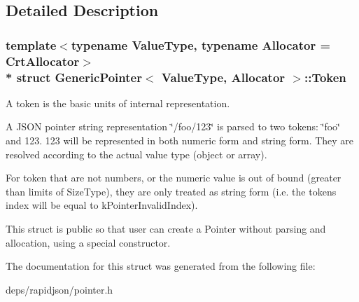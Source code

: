 \subsection{Detailed Description}
\subsubsection*{template$<$typename Value\+Type, typename Allocator = Crt\+Allocator$>$\\*
struct Generic\+Pointer$<$ Value\+Type, Allocator $>$\+::\+Token}

A token is the basic units of internal representation. 

A J\+S\+ON pointer string representation \char`\"{}/foo/123\char`\"{} is parsed to two tokens\+: \char`\"{}foo\char`\"{} and 123. 123 will be represented in both numeric form and string form. They are resolved according to the actual value type (object or array).

For token that are not numbers, or the numeric value is out of bound (greater than limits of Size\+Type), they are only treated as string form (i.\+e. the token\textquotesingle{}s index will be equal to k\+Pointer\+Invalid\+Index).

This struct is public so that user can create a Pointer without parsing and allocation, using a special constructor. 

The documentation for this struct was generated from the following file\+:\begin{DoxyCompactItemize}
\item 
deps/rapidjson/pointer.\+h\end{DoxyCompactItemize}

